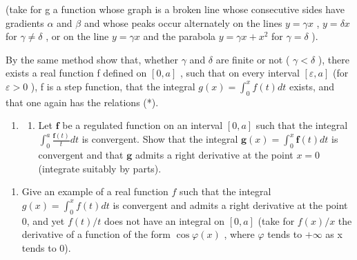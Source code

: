 (take for g a function whose graph is a broken line whose consecutive sides have gradients \(\alpha\) and \(\beta\) and whose peaks occur alternately on the lines \(y = \gamma x\) , \(y = \delta x\) for \(\gamma \neq \delta\) , or on the line \(y = \gamma x\) and the parabola \(y = \gamma x + x^{2}\) for \(\gamma = \delta\) ).

By the same method show that, whether \(\gamma\) and \(\delta\) are finite or not ( \(\gamma < \delta\) ), there exists a real function f defined on \([0, a]\) , such that on every interval \([\varepsilon, a]\) (for \(\varepsilon > 0\) ), f is a step function, that the integral \(g(x) = \int_{0}^{x} f(t) dt\) exists, and that one again has the relations (*).

\begin{enumerate}
\def\labelenumi{\arabic{enumi})}
\setcounter{enumi}{1}
\tightlist
\item
  \begin{enumerate}
  \def\labelenumii{\alph{enumii})}
  \tightlist
  \item
    Let \(\mathbf{f}\) be a regulated function on an interval \([0, a]\) such that the integral \(\int_0^a \frac{\mathbf{f}(t)}{t} dt\) is convergent. Show that the integral \(\mathbf{g}(x) = \int_0^x \mathbf{f}(t) dt\) is convergent and that \(\mathbf{g}\) admits a right derivative at the point \(x = 0\) (integrate suitably by parts).
  \end{enumerate}
\end{enumerate}

\begin{enumerate}
\def\labelenumi{\alph{enumi})}
\setcounter{enumi}{1}
\tightlist
\item
  Give an example of a real function \(f\) such that the integral \(g(x) = \int_0^x f(t)dt\) is convergent and admits a right derivative at the point 0, and yet \(f(t) / t\) does not have an integral on \([0, a]\) (take for \(f(x)/x\) the derivative of a function of the form \(\cos\varphi(x)\) , where \(\varphi\) tends to \(+\infty\) as x tends to 0).
\end{enumerate}

